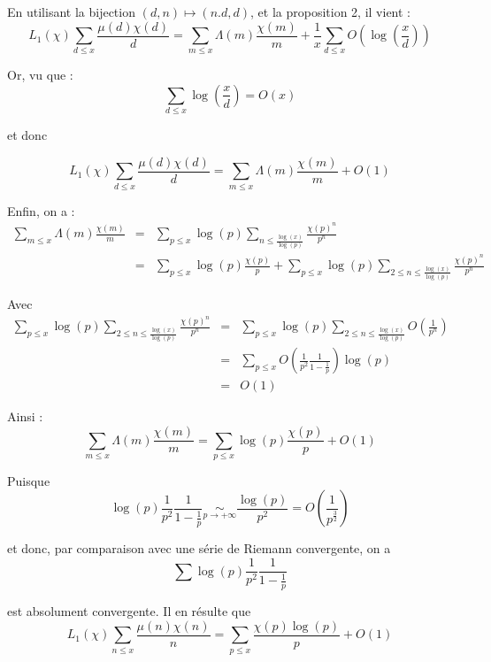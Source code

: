 En utilisant la bijection $(d, n) \longmapsto (n.d, d)$, et la proposition 2,
il vient :
\[ L_1 (\chi) \underset{d \leqslant x}{\sum} \frac{\mu (d) \chi (d)}{d} =
   \underset{m \leqslant x}{\sum} \Lambda (m) \frac{\chi (m)}{m} + \frac{1}{x}
   \underset{d \leqslant x}{\sum} O \left( \log \left( \frac{x}{d} \right)
   \right) \]


Or, vu que :
\[ \underset{d \leqslant x}{\sum} \log \left( \frac{x}{d} \right) = O (x) \]


et donc


\[ L_1 (\chi) \underset{d \leqslant x}{\sum} \frac{\mu (d) \chi (d)}{d} =
   \underset{m \leqslant x}{\sum} \Lambda (m) \frac{\chi (m)}{m} + O (1) \]


Enfin, on a :
\begin{eqnarray*}
  \underset{m \leqslant x}{\sum} \Lambda (m) \frac{\chi (m)}{m} & = &
  \underset{p \leqslant x}{\sum} \log (p) \underset{n \leqslant \frac{\log
  (x)}{\log (p)}}{\sum} \frac{\chi (p)^n}{p^n}\\
  & = & \underset{p \leqslant x}{\sum} \log (p) \frac{\chi (p) }{p } +
  \underset{p \leqslant x}{\sum} \log (p) \underset{2 \leqslant n \leqslant
  \frac{\log (x)}{\log (p)}}{\sum} \frac{\chi (p)^n}{p^n}
\end{eqnarray*}


Avec
\begin{eqnarray*}
  \underset{p \leqslant x}{\sum} \log (p) \underset{2 \leqslant n \leqslant
  \frac{\log (x)}{\log (p)}}{\sum} \frac{\chi (p)^n}{p^n} & = & \underset{p
  \leqslant x}{\sum} \log (p) \underset{2 \leqslant n \leqslant \frac{\log
  (x)}{\log (p)}}{\sum} O \left( \frac{1}{p^n} \right)\\
  & = & \underset{p \leqslant x}{\sum} O \left( \frac{1}{p^2} \frac{1}{1 -
  \frac{1}{p}} \right) \log (p)\\
  & = & O (1)
\end{eqnarray*}


Ainsi :
\[ \underset{m \leqslant x}{\sum} \Lambda (m) \frac{\chi (m)}{m} = \underset{p
   \leqslant x}{\sum} \log (p) \frac{\chi (p) }{p } + O (1) \]


Puisque
\[ \log (p) \frac{1}{p^2} \frac{1}{1 - \frac{1}{p}} \underset{p \rightarrow +
   \infty}{\sim} \frac{\log (p)}{p^2} = O \left( \frac{1}{p^{\frac{3}{2}}}
   \right) \]


et donc, par comparaison avec une s{\'e}rie de Riemann convergente, on a
\[ \sum \log (p) \frac{1}{p^2} \frac{1}{1 - \frac{1}{p}} \]


est absolument convergente. Il en r{\'e}sulte que
\[ L_1 (\chi) \underset{n \leqslant x}{\sum} \frac{\mu (n) \chi (n)}{n} =
   \underset{p \leqslant x}{\sum} \frac{\chi (p) \log (p)}{p} + O (1) \]


